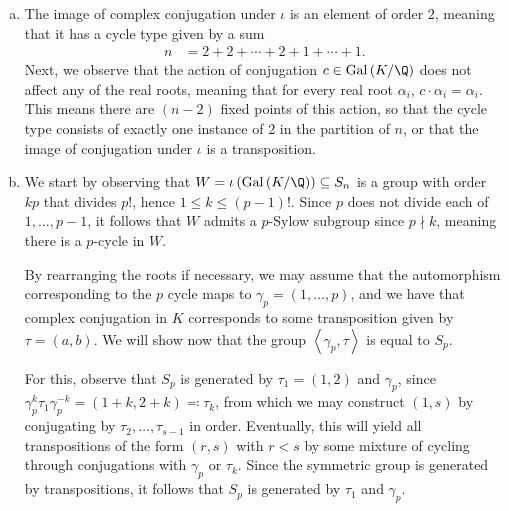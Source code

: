 \documentclass[10pt]{mypackage}
\begin{document}
\begin{solution}
\begin{enumerate}[(a)]
      For this, we have
      \begin{align*}
        \mu_{\alpha,F} \left( \overline{\alpha} \right) &= \overline{\alpha}^{n} + a_{n-1} \overline{\alpha}^{n-1} + \cdots + a_1\overline{\alpha} + a_0\\
                                                        &= \overline{\alpha^{n} + a_{n-1}\alpha^{n-1} + \cdots + a_1 \alpha + a_0}\\
                                                        &= 0,
      \end{align*}
      so we have our desired result.
    \item The image of complex conjugation under $\iota$ is an element of order $2$, meaning that it has a cycle type given by a sum
      \begin{align*}
        n &= 2 + 2 + \cdots + 2 + 1 + \cdots + 1.
      \end{align*}
      Next, we observe that the action of conjugation $c\in \operatorname{Gal}\left( K/\Q \right)$ does not affect any of the real roots, meaning that for every real root $\alpha_i$, $c\cdot \alpha_i = \alpha_i$. This means there are $\left( n-2 \right)$ fixed points of this action, so that the cycle type consists of exactly one instance of $2$ in the partition of $n$, or that the image of conjugation under $\iota$ is a transposition.
    \item We start by observing that $ W = \iota\left( \operatorname{Gal}\left( K/\Q \right) \right)\subseteq S_n $ is a group with order $kp$ that divides $p!$, hence $1\leq k \leq \left( p-1 \right)!$. Since $p$ does not divide each of $1,\dots,p-1$, it follows that $W$ admits a $p$-Sylow subgroup since $p\nmid k$, meaning there is a $p$-cycle in $W$.

      By rearranging the roots if necessary, we may assume that the automorphism corresponding to the $p$ cycle maps to $\gamma_p = \left( 1,\dots,p \right)$, and we have that complex conjugation in $K$ corresponds to some transposition given by $\tau = \left( a,b \right)$. We will show now that the group $\left\langle \gamma_p,\tau \right\rangle$ is equal to $S_p$.

      For this, observe that $S_p$ is generated by $\tau_1 = \left( 1,2 \right)$ and $\gamma_p$, since $\gamma_p^{k}\tau_1\gamma_p^{-k} = \left( 1+k,2+k \right) \eqcolon \tau_k$, from which we may construct $\left( 1,s \right)$ by conjugating by $\tau_2,\dots,\tau_{s-1}$ in order. Eventually, this will yield all transpositions of the form $\left( r,s \right)$ with $r < s$ by some mixture of cycling through conjugations with $\gamma_p$ or $\tau_k$. Since the symmetric group is generated by transpositions, it follows that $S_p$ is generated by $\tau_1$ and $\gamma_p$.


\end{enumerate}
\end{solution}
\end{document}
